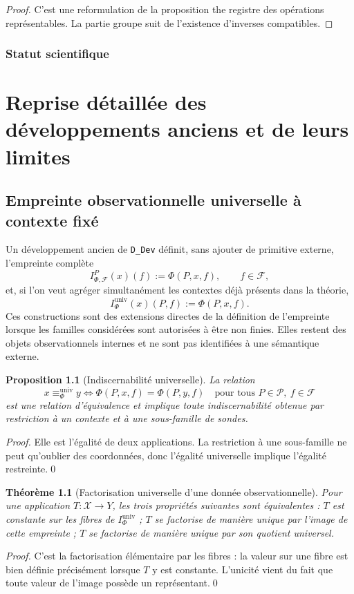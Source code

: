 \documentclass[11pt,a4paper,openany]{book}
\newtheorem{proposition}[definition]{Proposition}
\newtheorem{theorem}[definition]{Théorème}
\begin{document}
\begin{proof}
C'est une reformulation de la proposition the registre des opérations représentables. La partie groupe suit de l'existence d'inverses compatibles.
\end{proof}

\subsection{Statut scientifique}

\chapter{Reprise détaillée des développements anciens et de leurs limites}
\section{Empreinte observationnelle universelle à contexte fixé}
Un développement ancien de \texttt{D\_Dev} définit, sans ajouter de primitive externe, l'empreinte complète
\[
I_{\Phi,\mathcal F}^{P}(x)(f):=\Phi(P,x,f),\qquad f\in\mathcal F,
\]
et, si l'on veut agréger simultanément les contextes déjà présents dans la théorie,
\[
I_{\Phi}^{\mathrm{univ}}(x)(P,f):=\Phi(P,x,f).
\]
Ces constructions sont des extensions directes de la définition de l'empreinte lorsque les familles considérées sont autorisées à être non finies. Elles restent des objets observationnels internes et ne sont pas identifiées à une sémantique externe.

\begin{proposition}[Indiscernabilité universelle]
La relation
\[
x\equiv_{\Phi}^{\mathrm{univ}}y
\Longleftrightarrow
\Phi(P,x,f)=\Phi(P,y,f)\quad\text{pour tous }P\in\mathcal P,\ f\in\mathcal F
\]
est une relation d'équivalence et implique toute indiscernabilité obtenue par restriction à un contexte et à une sous-famille de sondes.
\end{proposition}
\begin{proof}
Elle est l'égalité de deux applications. La restriction à une sous-famille ne peut qu'oublier des coordonnées, donc l'égalité universelle implique l'égalité restreinte.\qed\end{proof}

\begin{theorem}[Factorisation universelle d'une donnée observationnelle]
Pour une application \(T:\mathcal X\to Y\), les trois propriétés suivantes sont équivalentes : \(T\) est constante sur les fibres de \(I_{\Phi}^{\mathrm{univ}}\) ; \(T\) se factorise de manière unique par l'image de cette empreinte ; \(T\) se factorise de manière unique par son quotient universel.
\end{theorem}
\begin{proof}
C'est la factorisation élémentaire par les fibres : la valeur sur une fibre est bien définie précisément lorsque \(T\) y est constante. L'unicité vient du fait que toute valeur de l'image possède un représentant.\qed\end{proof}
\end{document}
